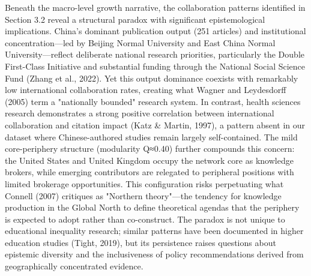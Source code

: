 \documentclass[12pt,a4paper]{article}
\begin{document}
Beneath the macro-level growth narrative, the collaboration patterns identified in Section 3.2 reveal a structural paradox with significant epistemological implications. China's dominant publication output (251 articles) and institutional concentration—led by Beijing Normal University and East China Normal University—reflect deliberate national research priorities, particularly the Double First-Class Initiative and substantial funding through the National Social Science Fund (Zhang et al., 2022). Yet this output dominance coexists with remarkably low international collaboration rates, creating what Wagner and Leydesdorff (2005) term a "nationally bounded" research system. In contrast, health sciences research demonstrates a strong positive correlation between international collaboration and citation impact (Katz \& Martin, 1997), a pattern absent in our dataset where Chinese-authored studies remain largely self-contained. The mild core-periphery structure (modularity Q≈0.40) further compounds this concern: the United States and United Kingdom occupy the network core as knowledge brokers, while emerging contributors are relegated to peripheral positions with limited brokerage opportunities. This configuration risks perpetuating what Connell (2007) critiques as "Northern theory"—the tendency for knowledge production in the Global North to define theoretical agendas that the periphery is expected to adopt rather than co-construct. The paradox is not unique to educational inequality research; similar patterns have been documented in higher education studies (Tight, 2019), but its persistence raises questions about epistemic diversity and the inclusiveness of policy recommendations derived from geographically concentrated evidence.
\end{document}

